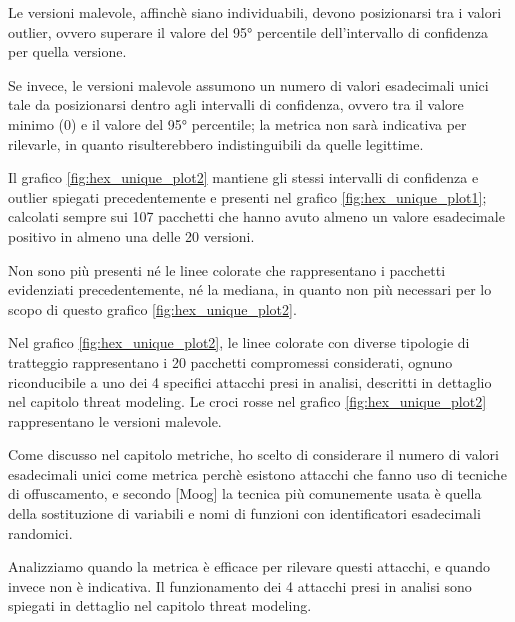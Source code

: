 Le versioni malevole, affinchè siano individuabili, devono 
posizionarsi tra i valori outlier, ovvero superare 
il valore del 95° percentile dell'intervallo di confidenza per quella versione.

Se invece, le versioni malevole assumono un numero di 
valori esadecimali unici tale da posizionarsi dentro agli
intervalli di confidenza, ovvero tra il valore minimo (0) e il valore del 95° percentile;
la metrica non sarà indicativa per rilevarle,
in quanto risulterebbero indistinguibili da quelle legittime.


Il grafico \ref{fig:hex_unique_plot2} mantiene gli stessi intervalli di confidenza 
e outlier spiegati precedentemente e presenti nel grafico \ref{fig:hex_unique_plot1}; 
calcolati sempre sui 107 pacchetti che hanno avuto almeno un valore esadecimale positivo in almeno una delle 20 versioni.

Non sono più presenti né le linee colorate che rappresentano i pacchetti evidenziati precedentemente,
né la mediana, in quanto non più necessari per lo scopo di questo grafico \ref{fig:hex_unique_plot2}.

Nel grafico \ref{fig:hex_unique_plot2}, le linee colorate con diverse tipologie di tratteggio
rappresentano i 20 pacchetti compromessi considerati, ognuno riconducibile a uno dei 4 specifici attacchi presi in analisi,
descritti in dettaglio nel capitolo threat modeling.
Le croci rosse nel grafico \ref{fig:hex_unique_plot2} 
rappresentano le versioni malevole.

Come discusso nel capitolo metriche, ho scelto di considerare il numero di valori esadecimali unici come metrica 
perchè esistono attacchi che fanno uso di tecniche di offuscamento,
e secondo [Moog] la tecnica più comunemente usata 
è quella della sostituzione di variabili e nomi di funzioni con identificatori esadecimali randomici.

Analizziamo quando la metrica è efficace per rilevare questi attacchi, e quando invece non è indicativa.
Il funzionamento dei 4 attacchi presi in analisi sono spiegati in dettaglio nel capitolo threat modeling.

